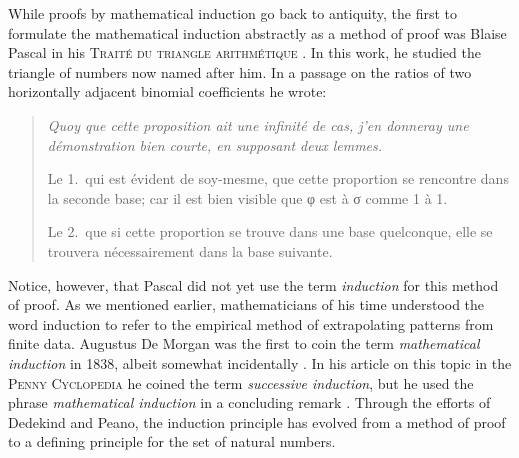 While proofs by mathematical induction go back to antiquity, the first to formulate the mathematical induction abstractly as a method of proof was Blaise Pascal in his \textsc{Traité du triangle arithmétique} \cite{pascal1665}. In this work, he studied the triangle of numbers now named after him. In a passage on the ratios of two horizontally adjacent binomial coefficients he wrote:
\begin{quote}
  {\itshape
    Quoy que cette proposition ait une infinité de cas, j'en donneray une démonstration bien courte, en supposant deux lemmes.
    
    Le 1.~qui est évident de soy-mesme, que cette proportion se rencontre dans la seconde base; car il est bien visible que φ est à σ comme 1 à 1.
    
    Le 2.~que si cette proportion se trouve dans une base quelconque, elle se trouvera nécessairement dans la base suivante.  
  }
\end{quote}
Notice, however, that Pascal did not yet use the term \emph{induction} for this method of proof. As we mentioned earlier, mathematicians of his time understood the word induction to refer to the empirical method of extrapolating patterns from finite data. Augustus De Morgan was the first to coin the term \emph{mathematical induction} in 1838, albeit somewhat incidentally \cite{cajori1918}. In his article on this topic in the \textsc{Penny Cyclopedia} he coined the term \emph{successive induction}, but he used the phrase \emph{mathematical induction} in a concluding remark \cite{demorgan1838}. Through the efforts of Dedekind and Peano, the induction principle has evolved from a method of proof to a defining principle for the set of natural numbers. 


